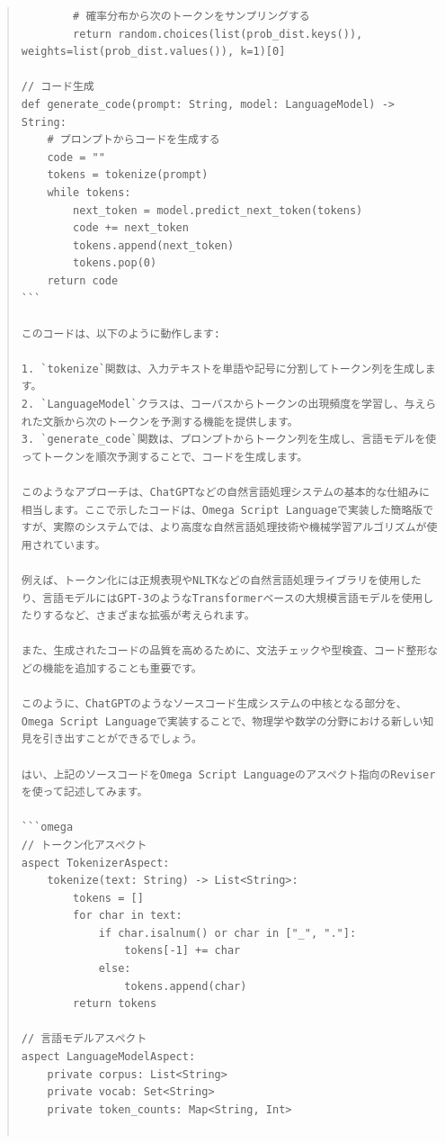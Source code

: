 \documentclass{jsarticle}
\begin{document}
\begin{quote}
\begin{verbatim}
        # 確率分布から次のトークンをサンプリングする
        return random.choices(list(prob_dist.keys()), weights=list(prob_dist.values()), k=1)[0]

// コード生成
def generate_code(prompt: String, model: LanguageModel) -> String:
    # プロンプトからコードを生成する
    code = ""
    tokens = tokenize(prompt)
    while tokens:
        next_token = model.predict_next_token(tokens)
        code += next_token
        tokens.append(next_token)
        tokens.pop(0)
    return code
```

このコードは、以下のように動作します:

1. `tokenize`関数は、入力テキストを単語や記号に分割してトークン列を生成します。
2. `LanguageModel`クラスは、コーパスからトークンの出現頻度を学習し、与えられた文脈から次のトークンを予測する機能を提供します。
3. `generate_code`関数は、プロンプトからトークン列を生成し、言語モデルを使ってトークンを順次予測することで、コードを生成します。

このようなアプローチは、ChatGPTなどの自然言語処理システムの基本的な仕組みに相当します。ここで示したコードは、Omega Script Languageで実装した簡略版ですが、実際のシステムでは、より高度な自然言語処理技術や機械学習アルゴリズムが使用されています。

例えば、トークン化には正規表現やNLTKなどの自然言語処理ライブラリを使用したり、言語モデルにはGPT-3のようなTransformerベースの大規模言語モデルを使用したりするなど、さまざまな拡張が考えられます。

また、生成されたコードの品質を高めるために、文法チェックや型検査、コード整形などの機能を追加することも重要です。

このように、ChatGPTのようなソースコード生成システムの中核となる部分を、Omega Script Languageで実装することで、物理学や数学の分野における新しい知見を引き出すことができるでしょう。

はい、上記のソースコードをOmega Script Languageのアスペクト指向のReviserを使って記述してみます。

```omega
// トークン化アスペクト
aspect TokenizerAspect:
    tokenize(text: String) -> List<String>:
        tokens = []
        for char in text:
            if char.isalnum() or char in ["_", "."]:
                tokens[-1] += char
            else:
                tokens.append(char)
        return tokens

// 言語モデルアスペクト
aspect LanguageModelAspect:
    private corpus: List<String>
    private vocab: Set<String>
    private token_counts: Map<String, Int>


\end{verbatim}
\end{quote}
\end{document}
